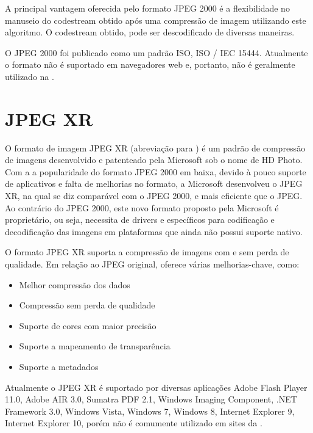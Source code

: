 \documentclass[espaco=simples,appendix=Name]{abnt}
\begin{document}
\begin{description}
A principal vantagem oferecida pelo formato JPEG 2000 é a flexibilidade no manuseio do codestream obtido após uma compressão de imagem utilizando este algoritmo. O codestream obtido, pode ser descodificado de diversas maneiras.

O JPEG 2000 foi publicado como um padrão ISO, ISO / IEC 15444. Atualmente o formato não é suportado em navegadores web e, portanto, não é geralmente utilizado na .\cite{JPEG}

\section{JPEG XR}
O formato de imagem JPEG XR (abreviação para ) é um padrão de compressão de imagens desenvolvido e patenteado pela Microsoft sob o nome de HD Photo.
Com a a popularidade do formato JPEG 2000 em baixa, devido à pouco suporte de aplicativos e falta de melhorias no formato, a Microsoft desenvolveu o JPEG XR, na qual se diz comparável com o JPEG 2000, e mais eficiente que o JPEG. Ao contrário do JPEG 2000, este novo formato proposto pela Microsoft é proprietário, ou seja, necessita de drivers e  específicos para codificação e decodificação das imagens em plataformas que ainda não possui suporte nativo.

O formato JPEG XR suporta a compressão de imagens com e sem perda de qualidade. Em relação ao JPEG original, oferece várias melhorias-chave, como:
\begin{itemize}
\item Melhor compressão dos dados
\item Compressão sem perda de qualidade
\item Suporte de cores com maior precisão
\item Suporte a  mapeamento de transparência
\item Suporte a metadados
\end{itemize}

Atualmente o JPEG XR é suportado por diversas aplicações Adobe Flash Player 11.0, Adobe AIR 3.0, Sumatra PDF 2.1, Windows Imaging Component, .NET Framework 3.0, Windows Vista, Windows 7, Windows 8, Internet Explorer 9, Internet Explorer 10, porém não é comumente utilizado em sites da .\cite{HDPhoto}

\end{description}
\end{document}
